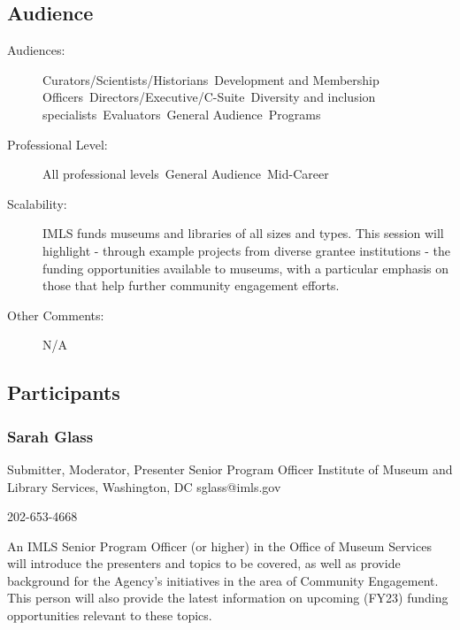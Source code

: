 \documentclass{report}
\begin{document}
              \subsection*{Audience}
                \begin{description}
                  \item [Audiences:]Curators/Scientists/Historians~Development and Membership Officers~Directors/Executive/C-Suite~Diversity and inclusion specialists~Evaluators~General Audience~Programs~
                  \item[Professional Level:]All professional levels~General Audience~Mid-Career~
                \item[Scalability:] IMLS funds museums and libraries of all sizes and types. This session will highlight - through example projects from diverse grantee institutions - the funding opportunities available to museums, with a particular emphasis on those that help further community engagement efforts. 

							
              \item[Other Comments:] N/A
              \end{description}
            \subsection*{Participants}
              \subsubsection*{ Sarah Glass }
              Submitter, Moderator, Presenter\newline
              Senior Program Officer\newline
              Institute of Museum and Library Services, Washington, DC
              \newline
              sglass@imls.gov\newline
              
              202-653-4668\newline

              An IMLS Senior Program Officer (or higher) in the Office of Museum Services will introduce the presenters and topics to be covered, as well as provide background for the Agency’s initiatives in the area of Community Engagement. This person will also provide the latest information on upcoming (FY23) funding opportunities relevant to these topics.\newline
\end{document}
